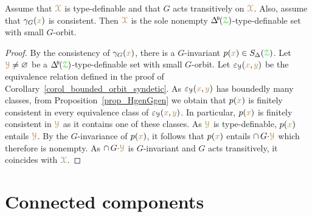 \begin{proposition}
  Assume that ${\color{brown}\EuScript X}$ is type-definable and that $G$ acts transitively on ${\color{brown}\EuScript X}$.
  Also, assume that $\gamma_G({\color{brown} x})$ is consistent.
  Then ${\color{brown}\EuScript X}$ is the sole nonempty $\BDelta(\grZ)$-type-definable set with small $G$-orbit.
\end{proposition}
\begin{proof}
  By the consistency of $\gamma_G({\color{brown} x})$, there is a $G$-invariant $p({\color{brown} x})\in S_\Delta({\color{green}\EuScript Z})$.
  Let ${\color{brown}\EuScript Y}\neq\varnothing$ be a $\BDelta(\grZ)$-type-definable set with small $G$-orbit.
  Let $\varepsilon_{\EuScript Y}({\color{brown} x},{\color{brown} y})$ be the equivalence relation defined in the proof of Corollary~\ref{corol_bounded_orbit_syndetic}.
  As $\varepsilon_{\EuScript Y}({\color{brown} x},{\color{brown} y})$ has boundedly many classes, from Proposition~\ref{prop_HgenGgen} we obtain that $p({\color{brown} x})$ is finitely consistent in every equivalence class of $\varepsilon_{\EuScript Y}({\color{brown} x},{\color{brown} y})$.
  In particular, $p({\color{brown} x})$ is finitely consistent in ${\color{brown}\EuScript Y}$ as it contains one of these classes.
  As ${\color{brown}\EuScript Y}$ is type-definable, $p({\color{brown} x})$ entails ${\color{brown}\EuScript Y}$.
  By the $G$-invariance of $p({\color{brown} x})$, it follows that $p({\color{brown} x})$ entails $\cap\,G{\cdot}{\color{brown}\EuScript Y}$ which therefore is nonempty.
  As $\cap\,G{\cdot}{\color{brown}\EuScript Y}$ is $G$-invariant and $G$ acts transitively, it coincides with ${\color{brown}\EuScript X}$.
\end{proof}



\section{Connected components}\label{G0}
\def\medrel#1{\parbox[t]{5ex}{$\displaystyle\hfil #1$}}
\def\ceq#1#2#3{\parbox[t]{12ex}{$\displaystyle #1$}\medrel{#2}{$\displaystyle #3$}}

